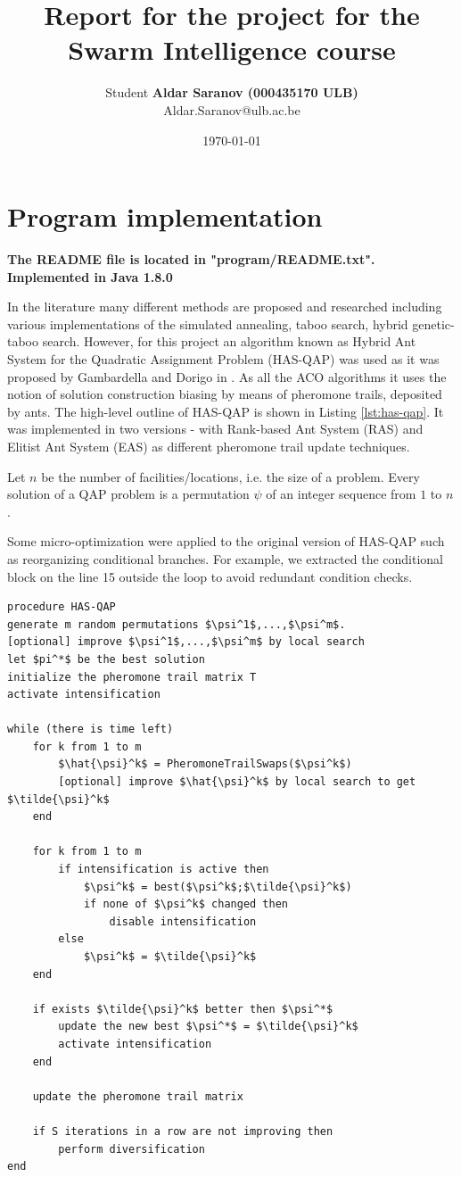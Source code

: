 \documentclass[12pt]{article}
\author{Student \textbf{Aldar Saranov (000435170 ULB)} \\ Aldar.Saranov@ulb.ac.be}
\date{\today}
\title{Report for the project for the Swarm Intelligence course}
\begin{document}
\maketitle
\newpage
\tableofcontents



\section{Program implementation}

\textbf{The README file is located in "program/README.txt". Implemented in Java 1.8.0}

In the literature many different methods are proposed and researched including various implementations of the simulated annealing, taboo search, hybrid genetic-taboo search. However, for this project an algorithm known as Hybrid Ant System for the Quadratic Assignment Problem (HAS-QAP) was used as it was proposed by Gambardella and Dorigo in \cite{Gambardella}. As all the ACO algorithms it uses the notion of solution construction biasing by means of pheromone trails, deposited by ants. The high-level outline of HAS-QAP is shown in Listing \ref{lst:has-qap}. It was implemented in two versions - with Rank-based Ant System (RAS) and Elitist Ant System (EAS) as different pheromone trail update techniques.

Let $n$ be the number of facilities/locations, i.e. the size of a problem. Every solution of a QAP problem is a permutation $\psi$ of an integer sequence from $1$ to $n$.

Some micro-optimization were applied to the original version of HAS-QAP such as reorganizing conditional branches. For example, we extracted the conditional block on the line 15 outside the loop to avoid redundant condition checks.


\begin{minipage}[c]{0.95\textwidth}
\begin{lstlisting}[caption={HAS-QAP pseudo-code}, label={lst:has-qap},mathescape]
procedure HAS-QAP
generate m random permutations $\psi^1$,...,$\psi^m$.
[optional] improve $\psi^1$,...,$\psi^m$ by local search
let $pi^*$ be the best solution
initialize the pheromone trail matrix T
activate intensification

while (there is time left)
	for k from 1 to m
		$\hat{\psi}^k$ = PheromoneTrailSwaps($\psi^k$)
		[optional] improve $\hat{\psi}^k$ by local search to get $\tilde{\psi}^k$
	end
	
	for k from 1 to m
		if intensification is active then
			$\psi^k$ = best($\psi^k$;$\tilde{\psi}^k$)		
			if none of $\psi^k$ changed then
				disable intensification
		else
			$\psi^k$ = $\tilde{\psi}^k$
	end
	
	if exists $\tilde{\psi}^k$ better then $\psi^*$
		update the new best $\psi^*$ = $\tilde{\psi}^k$
		activate intensification
	end
	
	update the pheromone trail matrix
	
	if S iterations in a row are not improving then
		perform diversification
end
\end{lstlisting}
\end{minipage}
\end{document}
